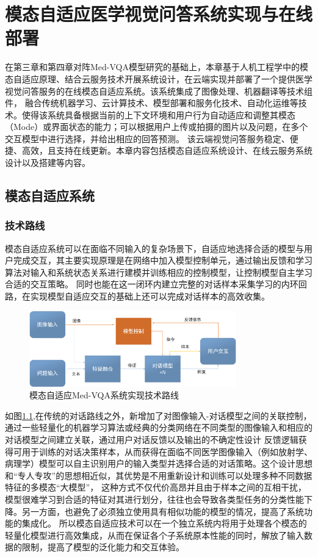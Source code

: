 \chapter{模态自适应医学视觉问答系统实现与在线部署}
在第三章和第四章对阵Med-VQA模型研究的基础上，本章基于人机工程学中的模态自适应原理、结合云服务技术开展系统设计，在云端实现并部署了一个提供医学视觉问答服务的在线模态自适应系统。该系统集成了图像处理、机器翻译等技术组件，
融合传统机器学习、云计算技术、模型部署和服务化技术、自动化运维等技术。使得该系统具备根据当前的上下文环境和用户行为自动适应和调整其模态（Mode）或界面状态的能力；可以根据用户上传或拍摄的图片以及问题，在多个交互模型中进行选择，并给出相应的回答预测。
该云端视觉问答服务稳定、便捷、高效，且支持在线更新。本章内容包括模态自适应系统设计、在线云服务系统设计以及搭建等内容。
%
\section{模态自适应系统}
\subsection{技术路线}
模态自适应系统可以在面临不同输入的复杂场景下，自适应地选择合适的模型与用户完成交互，其主要实现原理是在网络中加入模型控制单元，通过输出反馈和学习算法对输入和系统状态关系进行建模并训练相应的控制模型，让控制模型自主学习合适的交互策略。
同时也能在这一闭环内建立完整的对话样本采集学习的内环回路，在实现模型自适应交互的基础上还可以完成对话样本的高效收集。
\begin{figure}[htbp]
	\centering	
	\includegraphics[width=0.8\textwidth]{Fig/myfig/chapter5/sys_febroot.png}  %
	\caption{\label{sys_need}模态自适应Med-VQA系统实现技术路线} 
\end{figure}
如图\ref{sys_need},在传统的对话路线之外，新增加了对图像输入-对话模型之间的关联控制，通过一些轻量化的机器学习算法或经典的分类网络在不同类型的图像输入和相应的对话模型之间建立关联，通过用户对话反馈以及输出的不确定性设计
反馈逻辑获得可用于训练的对话决策样本，从而获得在面临不同医学图像输入（例如放射学、病理学）模型可以自主识别用户的输入类型并选择合适的对话策略。这个设计思想和“专人专攻”的思想相近似，其优势是不用重新设计和训练可以处理多种不同数据特征的多模态“大模型”，
这种方式不仅代价高昂并且由于样本之间的互相干扰，模型很难学习到合适的特征对其进行划分，往往也会导致各类型任务的分类性能下降。另一方面，也避免了必须独立使用具有相似功能的模型的情况，提高了系统功能的集成化。
所以模态自适应技术可以在一个独立系统内将用于处理各个模态的轻量化模型进行高效集成，从而在保证各个子系统原本性能的同时，解放了输入数据的限制，提高了模型的泛化能力和交互体验。

